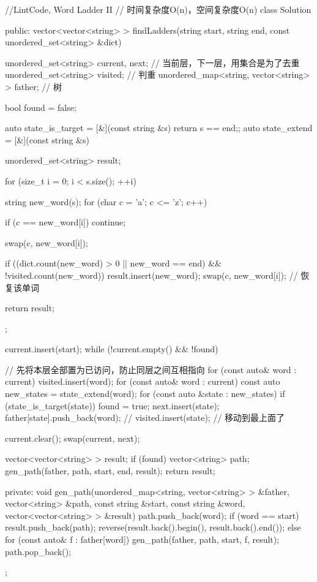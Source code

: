 \begin{Code}
//LintCode, Word Ladder II
// 时间复杂度O(n)，空间复杂度O(n)
class Solution {
public:
    vector<vector<string> > findLadders(string start, string end,
            const unordered_set<string> &dict) {
        unordered_set<string> current, next;  // 当前层，下一层，用集合是为了去重
        unordered_set<string> visited; // 判重
        unordered_map<string, vector<string> > father; // 树

        bool found = false;

        auto state_is_target = [&](const string &s) {return s == end;};
        auto state_extend = [&](const string &s) {
            unordered_set<string> result;

            for (size_t i = 0; i < s.size(); ++i) {
                string new_word(s);
                for (char c = 'a'; c <= 'z'; c++) {
                    if (c == new_word[i]) continue;

                    swap(c, new_word[i]);

                    if ((dict.count(new_word) > 0 || new_word == end) &&
                             !visited.count(new_word)) {
                        result.insert(new_word);
                    }
                    swap(c, new_word[i]); // 恢复该单词
                }
            }

            return result;
        };

        current.insert(start);
        while (!current.empty() && !found) {
            // 先将本层全部置为已访问，防止同层之间互相指向
            for (const auto& word : current)
                visited.insert(word);
            for (const auto& word : current) {
                const auto new_states = state_extend(word);
                for (const auto &state : new_states) {
                    if (state_is_target(state)) found = true;
                    next.insert(state);
                    father[state].push_back(word);
                    // visited.insert(state); // 移动到最上面了
                }
            }

            current.clear();
            swap(current, next);
        }
        vector<vector<string> > result;
        if (found) {
            vector<string> path;
            gen_path(father, path, start, end, result);
        }
        return result;
    }
private:
    void gen_path(unordered_map<string, vector<string> > &father,
            vector<string> &path, const string &start, const string &word,
            vector<vector<string> > &result) {
        path.push_back(word);
        if (word == start) {
            result.push_back(path);
            reverse(result.back().begin(), result.back().end());
        } else {
            for (const auto& f : father[word]) {
                gen_path(father, path, start, f, result);
            }
        }
        path.pop_back();
    }
};
\end{Code}


